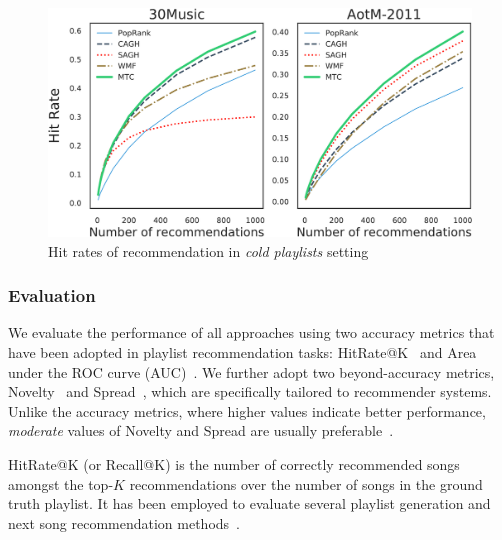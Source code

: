 \begin{figure}[!t]
    \centering
    \includegraphics[width=\columnwidth]{fig/hr3.pdf}
    \caption{Hit rates of recommendation in \emph{cold playlists} setting}
\end{figure}


\subsubsection{Evaluation}

We evaluate the performance of all approaches using two accuracy metrics that have been adopted 
in playlist recommendation tasks:
HitRate@K~\cite{hariri2012context} and Area under the ROC curve (AUC)~\cite{manning2008introIR}.
We further adopt two beyond-accuracy metrics, \ie
Novelty~\cite{zhang2012auralist,schedl2017} and Spread~\cite{kluver2014evaluating},
which are specifically tailored to recommender systems.
Unlike the accuracy metrics, where higher values indicate better performance,
\emph{moderate} values of Novelty and Spread are usually preferable~\cite{kluver2014evaluating,schedl2017}.
%

HitRate@K (or Recall@K) is the number of correctly recommended songs amongst the top-$K$ recommendations over
the number of songs in the ground truth playlist. %
It has been employed to evaluate several playlist generation and next song recommendation
methods~\cite{hariri2012context,bonnin2013evaluating,bonnin2015automated,jannach2015beyond}.

